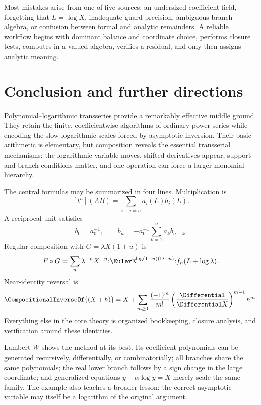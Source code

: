 \documentclass[11pt,openany]{book}
\theoremstyle{definition}
\theoremstyle{plain}
\theoremstyle{remark}
\newcommand{\rev}[1]{\CompositionalInverseOf{#1}}
\newcommand{\Dop}{\mathrm{D}}
\newcommand{\compose}{\mathbin{\circ}}
\begin{document}
\begin{summarybox}
Most mistakes arise from one of five sources: an undersized coefficient field,
forgetting that \(L=\log X\), inadequate guard precision, ambiguous branch
algebra, or confusion between formal and analytic remainders.  A reliable
workflow begins with dominant balance and coordinate choice, performs closure
tests, computes in a valued algebra, verifies a residual, and only then assigns
analytic meaning.
\end{summarybox}

\chapter{Conclusion and further directions}\label{ch:conclusion}
Polynomial--logarithmic transseries provide a remarkably effective middle
ground.  They retain the finite, coefficientwise algorithms of ordinary power
series while encoding the slow logarithmic scales forced by asymptotic
inversion.  Their basic arithmetic is elementary, but composition reveals the
essential transserial mechanisms: the logarithmic variable moves, shifted
derivatives appear, support and branch conditions matter, and one operation
can force a larger monomial hierarchy.

The central formulas may be summarized in four lines.  Multiplication is
\[
 [t^n](AB)=\sum_{i+j=n}a_i(L)b_j(L).
\]
A reciprocal unit satisfies
\[
 b_0=a_0^{-1},
 \qquad
 b_n=-a_0^{-1}\sum_{k=1}^na_kb_{n-k}.
\]
Regular composition with \(G=\lambda X(1+u)\) is
\[
 F\compose G
 =\sum_n\lambda^{-n}X^{-n}
 \mathopen{:}\EulerE^{\log(1+u)(\Dop-n)}\mathclose{:}
 f_n(L+\log\lambda).
\]
Near-identity reversal is
\[
 \rev{(X+h)}
 =X+\sum_{m\ge1}\frac{(-1)^m}{m!}
 \left(\frac{\Differential}{\Differential X}\right)^{m-1}h^m.
\]
Everything else in the core theory is organized bookkeeping, closure analysis,
and verification around these identities.

Lambert \(W\) shows the method at its best.  Its coefficient polynomials can be
generated recursively, differentially, or combinatorially; all branches share
the same polynomials; the real lower branch follows by a sign change in the
large coordinate; and generalized equations \(y+\alpha\log y=X\) merely scale
the same family.  The example also teaches a broader lesson: the correct
asymptotic variable may itself be a logarithm of the original argument.
\end{document}
